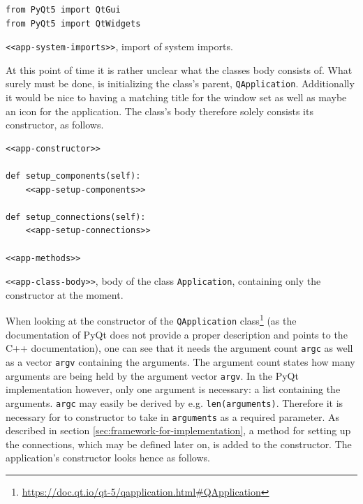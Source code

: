 \documentclass[10pt, openright, notitlepage]{scrreprt}
\begin{document}
\begin{listing}[H]
\begin{verbatim}
from PyQt5 import QtGui
from PyQt5 import QtWidgets
\end{verbatim}
\caption{\label{app-system-imports}
\texttt{<<app-system-imports>>}, import of system imports.}
\end{listing}

At this point of time it is rather unclear what the classes body consists of.
What surely must be done, is initializing the class's parent, \texttt{QApplication}.
Additionally it would be nice to having a matching title for the window set as
well as maybe an icon for the application. The class's body therefore solely
consists its constructor, as follows.

\begin{listing}[H]
\begin{verbatim}
<<app-constructor>>

def setup_components(self):
    <<app-setup-components>>

def setup_connections(self):
    <<app-setup-connections>>

<<app-methods>>
\end{verbatim}
\caption{\label{app-class-body}
\texttt{<<app-class-body>>}, body of the class \texttt{Application}, containing only the constructor at the moment.}
\end{listing}

When looking at the constructor of the \texttt{QApplication}
class\footnote{\url{https://doc.qt.io/qt-5/qapplication.html\#QApplication}} (as the
documentation of PyQt does not provide a proper description and points to the
C++ documentation), one can see that it needs the argument count \texttt{argc} as well
as a vector \texttt{argv} containing the arguments. The argument count states how many
arguments are being held by the argument vector \texttt{argv}. In the PyQt
implementation however, only one argument is necessary: a list containing the
arguments. \texttt{argc} may easily be derived by e.g. \texttt{len(arguments)}. Therefore it
is necessary for to constructor to take in \texttt{arguments} as a required parameter.
As described in section \ref{sec:framework-for-implementation}, a method for setting up
the connections, which may be defined later on, is added to the constructor. The
application's constructor looks hence as follows.
\end{document}
